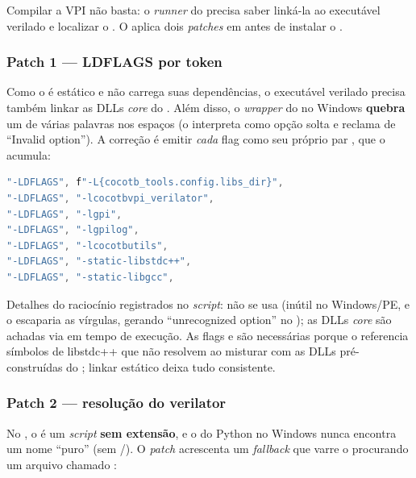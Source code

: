 Compilar a VPI não basta: o \emph{runner} do  precisa saber linká-la
ao executável verilado e localizar o . O
 aplica dois \emph{patches} em
 antes de instalar o .

\subsubsection{Patch 1 --- LDFLAGS por token}

Como o  é estático e não carrega suas dependências, o executável verilado
precisa também linkar as DLLs \emph{core} do . Além disso, o
\emph{wrapper}  do  no Windows \textbf{quebra} um
 de várias palavras nos espaços (o  interpreta
 como opção solta e reclama de \enquote{Invalid option}). A
correção é emitir \emph{cada} flag como seu próprio par ,
que o  acumula:

\begin{lstlisting}[language=Java,caption={Substituição do par -LDFLAGS no runner (cada flag vira um token).}]
"-LDFLAGS", f"-L{cocotb_tools.config.libs_dir}",
"-LDFLAGS", "-lcocotbvpi_verilator",
"-LDFLAGS", "-lgpi",
"-LDFLAGS", "-lgpilog",
"-LDFLAGS", "-lcocotbutils",
"-LDFLAGS", "-static-libstdc++",
"-LDFLAGS", "-static-libgcc",
\end{lstlisting}

Detalhes do raciocínio registrados no \emph{script}: não se usa
 (inútil no Windows/PE, e o  escaparia as
vírgulas, gerando \enquote{unrecognized option} no ); as DLLs \emph{core}
são achadas via  em tempo de execução. As flags
 e  são necessárias porque o
 referencia símbolos de libstdc++ que não resolvem ao misturar
com as DLLs pré-construídas do ; linkar estático deixa tudo
consistente.

\subsubsection{Patch 2 --- resolução do verilator}

No , o  é um \emph{script}  \textbf{sem
extensão}, e o  do Python no Windows nunca encontra um nome
\enquote{puro} (sem /). O \emph{patch} acrescenta um
\emph{fallback} que varre o  procurando um arquivo chamado
:

